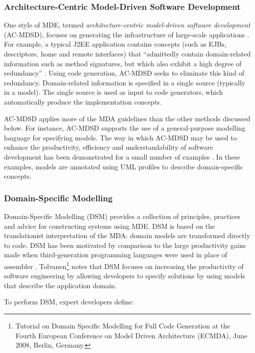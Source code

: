 \subsubsection{Architecture-Centric Model-Driven Software Development}
One style of MDE, termed \textit{architecture-centric model-driven software development} (AC-MDSD), focuses on generating the infrastructure of large-scale applications \cite{stahl06mdsd}. For example, a typical J2EE application contains concepts (such as EJBs, descriptors, home and remote interfaces) that ``admittedly contain domain-related information such as method signatures, but which also exhibit a high degree of redundancy'' \cite{stahl06mdsd}. Using code generation, AC-MDSD seeks to eliminate this kind of redundancy. Domain-related information is specified in a single source (typically in a model). The single source is used as input to code generators, which automatically produce the implementation concepts.

AC-MDSD applies more of the MDA guidelines than the other methods discussed below. For instance, AC-MDSD supports the use of a general-purpose modelling language for specifying models. The \cc way in which AC-MDSD may be used to enhance the productivity, efficiency and understandability of software development has been demonstrated for a small number of examples \cite{stahl06mdsd}. In these examples, models are annotated using UML profiles to describe domain-specific concepts.


\subsubsection{Domain-Specific Modelling}
Domain-Specific \cc Modelling (DSM) \cite{kelly08dsm} provides a collection of principles, practices and advice for constructing systems using MDE. DSM is based on the translationist interpretation of the MDA: domain models are transformed directly to code. DSM \cc has been motivated by comparison to the large productivity gains made when third-generation programming languages were used in place of assembler \cite{kelly08dsm}. Tolvanen\footnote{Tutorial on Domain Specific Modelling for Full Code Generation at the Fourth European Conference on Model Driven Architecture (ECMDA), June 2008, Berlin, Germany.} notes that DSM focuses on increasing the productivity of software engineering by allowing developers to specify solutions by using models that describe the application domain.

To perform DSM, expert developers define:

